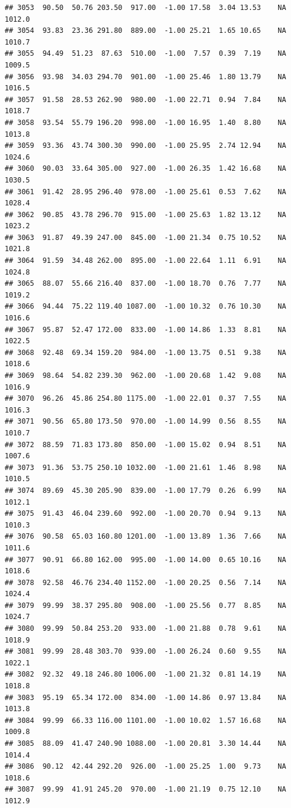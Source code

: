 \documentclass{article}\usepackage{graphicx, color}
\makeatletter
\newenvironment{kframe}{%
 \def\at@end@of@kframe{}%
 \ifinner\ifhmode%
  \def\at@end@of@kframe{\end{minipage}}%
  \begin{minipage}{\columnwidth}%
 \fi\fi%
 \def\FrameCommand##1{\hskip\@totalleftmargin \hskip-\fboxsep
 \colorbox{shadecolor}{##1}\hskip-\fboxsep
     \hskip-\linewidth \hskip-\@totalleftmargin \hskip\columnwidth}%
 \MakeFramed {\advance\hsize-\width
   \@totalleftmargin\z@ \linewidth\hsize
   \@setminipage}}%
 {\par\unskip\endMakeFramed%
 \at@end@of@kframe}
\newenvironment{knitrout}{}{} %
\makeatother
\begin{document}
\begin{knitrout}
\begin{kframe}
\begin{verbatim}
## 3053  90.50  50.76 203.50  917.00  -1.00 17.58  3.04 13.53    NA 1012.0
## 3054  93.83  23.36 291.80  889.00  -1.00 25.21  1.65 10.65    NA 1010.7
## 3055  94.49  51.23  87.63  510.00  -1.00  7.57  0.39  7.19    NA 1009.5
## 3056  93.98  34.03 294.70  901.00  -1.00 25.46  1.80 13.79    NA 1016.5
## 3057  91.58  28.53 262.90  980.00  -1.00 22.71  0.94  7.84    NA 1018.7
## 3058  93.54  55.79 196.20  998.00  -1.00 16.95  1.40  8.80    NA 1013.8
## 3059  93.36  43.74 300.30  990.00  -1.00 25.95  2.74 12.94    NA 1024.6
## 3060  90.03  33.64 305.00  927.00  -1.00 26.35  1.42 16.68    NA 1030.5
## 3061  91.42  28.95 296.40  978.00  -1.00 25.61  0.53  7.62    NA 1028.4
## 3062  90.85  43.78 296.70  915.00  -1.00 25.63  1.82 13.12    NA 1023.2
## 3063  91.87  49.39 247.00  845.00  -1.00 21.34  0.75 10.52    NA 1021.8
## 3064  91.59  34.48 262.00  895.00  -1.00 22.64  1.11  6.91    NA 1024.8
## 3065  88.07  55.66 216.40  837.00  -1.00 18.70  0.76  7.77    NA 1019.2
## 3066  94.44  75.22 119.40 1087.00  -1.00 10.32  0.76 10.30    NA 1016.6
## 3067  95.87  52.47 172.00  833.00  -1.00 14.86  1.33  8.81    NA 1022.5
## 3068  92.48  69.34 159.20  984.00  -1.00 13.75  0.51  9.38    NA 1018.6
## 3069  98.64  54.82 239.30  962.00  -1.00 20.68  1.42  9.08    NA 1016.9
## 3070  96.26  45.86 254.80 1175.00  -1.00 22.01  0.37  7.55    NA 1016.3
## 3071  90.56  65.80 173.50  970.00  -1.00 14.99  0.56  8.55    NA 1010.7
## 3072  88.59  71.83 173.80  850.00  -1.00 15.02  0.94  8.51    NA 1007.6
## 3073  91.36  53.75 250.10 1032.00  -1.00 21.61  1.46  8.98    NA 1010.5
## 3074  89.69  45.30 205.90  839.00  -1.00 17.79  0.26  6.99    NA 1012.1
## 3075  91.43  46.04 239.60  992.00  -1.00 20.70  0.94  9.13    NA 1010.3
## 3076  90.58  65.03 160.80 1201.00  -1.00 13.89  1.36  7.66    NA 1011.6
## 3077  90.91  66.80 162.00  995.00  -1.00 14.00  0.65 10.16    NA 1018.6
## 3078  92.58  46.76 234.40 1152.00  -1.00 20.25  0.56  7.14    NA 1024.4
## 3079  99.99  38.37 295.80  908.00  -1.00 25.56  0.77  8.85    NA 1024.7
## 3080  99.99  50.84 253.20  933.00  -1.00 21.88  0.78  9.61    NA 1018.9
## 3081  99.99  28.48 303.70  939.00  -1.00 26.24  0.60  9.55    NA 1022.1
## 3082  92.32  49.18 246.80 1006.00  -1.00 21.32  0.81 14.19    NA 1018.8
## 3083  95.19  65.34 172.00  834.00  -1.00 14.86  0.97 13.84    NA 1013.8
## 3084  99.99  66.33 116.00 1101.00  -1.00 10.02  1.57 16.68    NA 1009.8
## 3085  88.09  41.47 240.90 1088.00  -1.00 20.81  3.30 14.44    NA 1014.4
## 3086  90.12  42.44 292.20  926.00  -1.00 25.25  1.00  9.73    NA 1018.6
## 3087  99.99  41.91 245.20  970.00  -1.00 21.19  0.75 12.10    NA 1012.9

\end{verbatim}
\end{kframe}
\end{knitrout}
\end{document}
